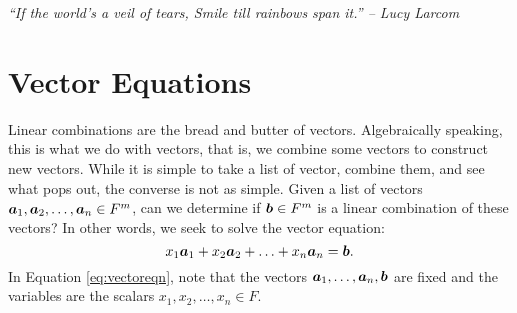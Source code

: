 \begin{center} 
\emph{``If the world's a veil of tears, Smile till rainbows span it.'' -- Lucy Larcom}
\end{center}

\section{Vector Equations}\label{sec:span}
Linear combinations are the bread and butter of vectors. Algebraically speaking, this is what we do with vectors, that is, we combine some vectors to construct new vectors. While it is simple to take a list of vector, combine them, and see what pops out, the converse is not as simple. Given a list of vectors $\boldsymbol a_1, \boldsymbol a_2, \ldots, \boldsymbol a_n\in F^m$, can we determine if $\boldsymbol b\in F^m$ is a linear combination of these vectors? In other words, we seek to solve the vector equation:
\begin{equation}\label{eq:vectoreqn} x_1\boldsymbol a_1 + x_2\boldsymbol a_2 + \ldots + x_n\boldsymbol a_n = \boldsymbol b.\end{equation} In Equation \eqref{eq:vectoreqn}, note that the vectors $\boldsymbol a_1,\ldots, \boldsymbol a_n, \boldsymbol b$ are fixed and the variables are the scalars $x_1, x_2, \ldots, x_n\in F$. \\

